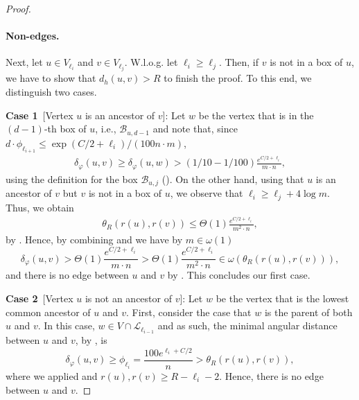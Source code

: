 \documentclass[letterpaper,11pt]{article}
\newcommand{\1}{\mathbb I}
\newcommand{\Layer}[1]{\mathcal{L}_{#1}}
\newcommand{\angulardist}[2]{\delta_\varphi(#1,#2)}
\newcommand{\boxbelow}[2]{\mathcal{B}_{#1, #2}}
\begin{document}
\begin{proof}
\paragraph{Non-edges.} Next, let $u \in V_{\ell_i}$ and $v \in V_{\ell_j}$. W.l.o.g. let $\ell_i \geq \ell_j$. Then, if $v$ is not in a box of $u$, we have to show that $d_h(u,v) > R$ to finish the proof. To this end, we distinguish two cases.

\smallskip

\textbf{Case 1}~[Vertex $u$ is an ancestor of $v$]: Let $w$ be the vertex that is in the $(d-1)$-th box of $u$, i.e., $\boxbelow{u}{d-1}$ and note that, since $d\cdot \phi_{\ell_{i+1}} \leq \exp(C/2 + \ell_i)/(100n\cdot m)$,
%
\begin{align}\label{eq:lower-bound-angle}
    \angulardist{u}{v} \geq \angulardist{u}{w} > (1/10 -1/100)\frac{e^{C/2 + \ell_i}}{m\cdot n} ,
\end{align}
%
using the definition for the box $\boxbelow{u}{j}$ ().
% 
On the other hand, using that $u$ is an ancestor of $v$ but $v$ is not in a box of $u$, we observe that $\ell_i \geq \ell_j + 4\log m$. Thus, we obtain
%
 \begin{align}\label{eq:lower-bound-angle2}
     \theta_R(r(u), r(v)) \leq \Theta(1) \frac{e^{C/2 + \ell_i}}{m^2 \cdot n},
 \end{align}
%
by . Hence, by combining  and  we have by $m \in \omega(1)$
%
$$
\angulardist{u}{v} > \Theta(1)\frac{e^{C/2 + \ell_i}}{m\cdot n} > \Theta(1) \frac{e^{C/2 + \ell_i}}{m^2 \cdot n} \in \omega(\theta_R(r(u), r(v))),
$$
%
and there is no edge between $u$ and $v$ by . This concludes our first case.

\smallskip

\textbf{Case 2}~[Vertex $u$ is not an ancestor of $v$]: Let $w$ be the vertex that is the lowest common ancestor of $u$ and $v$. First, consider the case that $w$ is the parent of both $u$ and $v$. In this case, $w \in V \cap \Layer{\ell_{i-1}}$ and as such, the minimal angular distance between $u$ and $v$, by , is 
%
$$
\angulardist{u}{v} \geq \phi_{\ell_i} = \frac{100e^{\ell_{i} + C/2}}{n} > \theta_R(r(u), r(v)),
$$
%
where we applied  and $r(u), r(v) \geq R - \ell_i -2$. Hence, there is no edge between $u$ and $v$.


\end{proof}
\end{document}
